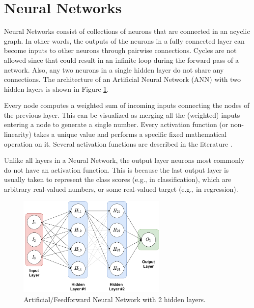\section{Neural Networks}\label{ANN}


Neural Networks consist of collections of neurons that are connected in an acyclic graph. In other words, the outputs of the neurons in a fully connected layer can become inputs to other neurons through pairwise connections. Cycles are not allowed since that could result in an infinite loop during the forward pass of a network. Also, any two neurons in a single hidden layer do not share any connections. The architecture of an Artificial Neural Network (ANN) with two hidden layers is shown in Figure  \ref{fig:ann_1}. 

Every node computes a weighted sum of incoming inputs connecting the nodes of the previous layer. This can be visualized as merging all the (weighted) inputs entering a node to generate a single number. Every activation function (or non-linearity) takes a unique value and performs a specific fixed mathematical operation on it. Several activation functions are described in the literature \parencite{goodfellow2016deep}.

Unlike all layers in a Neural Network, the output layer neurons most commonly do not have an activation function. This is because the last output layer is usually taken to represent the class scores (e.g., in classification), which are arbitrary real-valued numbers, or some real-valued target (e.g., in regression).

\begin{figure}[h]
\centering
\includegraphics[width=0.65\textwidth]{Figures/Chp2_CNN/CNN_NN.png}
\caption{Artificial/Feedforward Neural Network with 2 hidden layers.}
\label{fig:ann_1}
\end{figure}

